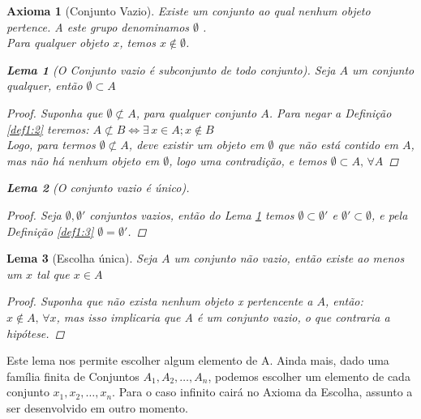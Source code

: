 \documentclass{article}
\theoremstyle{plain}
\newtheorem{lemma}{Lema}
\newtheorem{axm}{Axioma}
\theoremstyle{remark}
\numberwithin{equation}{section}
\numberwithin{thm}{section}
\numberwithin{defn}{section}
\numberwithin{lemma}{section}
\numberwithin{axm}{section}
\begin{document}
 \begin{axm}[Conjunto Vazio]\label{axm1:2}
 Existe um conjunto ao qual nenhum objeto pertence. A este grupo denominamos \(\emptyset\) .\\
 Para qualquer objeto \(x\), temos \(x \not\in \emptyset\).\\

\begin{lemma}[O Conjunto vazio é subconjunto de todo conjunto]\label{lem1:1}
 Seja \(A\) um conjunto qualquer, então \(\emptyset \subset A\)\\
 \begin{proof}
 Suponha que \(\emptyset \not\subset A\), para qualquer conjunto \(A\). Para negar a Definição \ref{def1:2} teremos: \(A \not\subset B \iff \exists \, x \in A; x \not\in B\) \\
 Logo, para termos \(\emptyset \not\subset A\), deve existir um objeto em \(\emptyset\) que não está contido em \(A\), mas não há nenhum objeto em \(\emptyset\), logo uma contradição, e temos \(\emptyset \subset A, \, \forall A\)
 \end{proof}
\end{lemma} 
 
 \begin{lemma}[O conjunto vazio é único]\label{lem1:2}
 	\begin{proof}
			 Seja \(\emptyset, \emptyset'\) conjuntos vazios, então do Lema \ref{lem1:1} temos \(\emptyset \subset 	\emptyset'\) e \(\emptyset' \subset \emptyset\), e pela Definição \ref{def1:3} \(\emptyset = \emptyset'\).
	 \end{proof}
 \end{lemma}
 \end{axm}
 
 \begin{lemma}[Escolha única]\label{lem1:3}
 Seja \(A\) um conjunto não vazio, então existe ao menos um \(x\) tal que \(x \in A\)\\
 \begin{proof}
 Suponha que não exista nenhum objeto x pertencente a \(A\), então: \(x \not\in A, \, \forall x\), mas isso implicaria que A é um conjunto vazio, o que contraria a hipótese.
 \end{proof}
\end{lemma}
Este lema nos permite escolher algum elemento de A. Ainda mais, dado uma família finita de Conjuntos \(A_1, A_2, \dots, A_n \), podemos escolher um elemento de cada conjunto \(x_1, x_2, \dots, x_n\). Para o caso infinito cairá no Axioma da Escolha, assunto a ser desenvolvido em outro momento.
\end{document}
